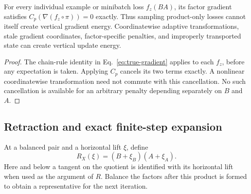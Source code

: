 \begin{corollary}
\label{cor:raw-horizontal}
For every individual example or minibatch loss $f_z(BA)$, its factor
gradient satisfies $C_p(\nabla(f_z\circ\pi))=0$ exactly. Thus sampling
product-only losses cannot itself create vertical gradient energy.
Coordinatewise adaptive transformations, stale gradient coordinates,
factor-specific penalties, and improperly transported state can create
vertical update energy.
\end{corollary}
\begin{proof}
The chain-rule identity in Eq.~\eqref{eq:true-gradient} applies to each
$f_z$, before any expectation is taken. Applying $C_p$ cancels its two
terms exactly. A nonlinear coordinatewise transformation need not commute
with this cancellation. No such cancellation is available for an arbitrary
penalty depending separately on $B$ and $A$.
\end{proof}

\subsection{Retraction and exact finite-step expansion}
At a balanced pair and a horizontal lift $\xi$, define
\begin{equation}
 R_X(\xi)=(B+\xi_B)(A+\xi_A).
 \label{eq:factor-retraction}
\end{equation}
Here and below a tangent on the quotient is identified with its horizontal
lift when used as the argument of $R$. Balance the factors after this
product is formed to obtain a representative for the next iteration.

